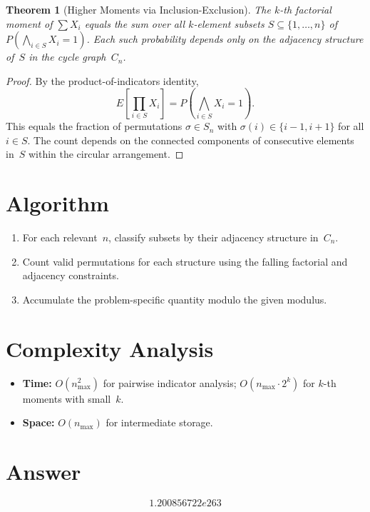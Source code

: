 \documentclass[12pt]{article}
\newtheorem{theorem}{Theorem}
\begin{document}
\begin{theorem}[Higher Moments via Inclusion-Exclusion]
The $k$-th factorial moment of $\sum X_i$ equals the sum over all $k$-element subsets $S \subseteq \{1,\ldots,n\}$ of $P(\bigwedge_{i \in S} X_i = 1)$. Each such probability depends only on the adjacency structure of~$S$ in the cycle graph~$C_n$.
\end{theorem}

\begin{proof}
By the product-of-indicators identity,
\[
E\!\left[\prod_{i \in S} X_i\right] = P\!\left(\bigwedge_{i \in S} X_i = 1\right).
\]
This equals the fraction of permutations $\sigma \in S_n$ with $\sigma(i) \in \{i-1, i+1\}$ for all $i \in S$. The count depends on the connected components of consecutive elements in~$S$ within the circular arrangement.
\end{proof}

\section{Algorithm}

\begin{enumerate}
\item For each relevant~$n$, classify subsets by their adjacency structure in~$C_n$.
\item Count valid permutations for each structure using the falling factorial and adjacency constraints.
\item Accumulate the problem-specific quantity modulo the given modulus.
\end{enumerate}

\section{Complexity Analysis}

\begin{itemize}
\item \textbf{Time:} $O(n_{\max}^2)$ for pairwise indicator analysis; $O(n_{\max} \cdot 2^k)$ for $k$-th moments with small~$k$.
\item \textbf{Space:} $O(n_{\max})$ for intermediate storage.
\end{itemize}

\section{Answer}

\[
\boxed{1.200856722e263}
\]
\end{document}
